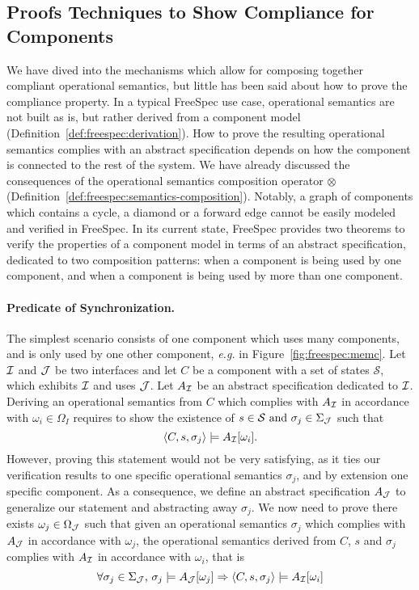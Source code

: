 \subsection{Proofs Techniques to Show Compliance for Components}

We have dived into the mechanisms which allow for composing together compliant
operational semantics, but little has been said about how to prove the
compliance property.
%
In a typical FreeSpec use case, operational semantics are not built as is, but
rather derived from a component model
(Definition~\ref{def:freespec:derivation}).
%
How to prove the resulting operational semantics complies with an abstract
specification depends on how the component is connected to the rest of the
system.
%
We have already discussed the consequences of the operational semantics
composition operator $\otimes$
(Definition~\ref{def:freespec:semantics-composition}).
%
Notably, a graph of components which contains a cycle, a diamond or a forward
edge cannot be easily modeled and verified in FreeSpec.
%
In its current state, FreeSpec provides two theorems to verify the properties
of a component model in terms of an abstract specification, dedicated to two
composition patterns: when a component is being used by one component, and
when a component is being used by more than one component.

\paragraph{Predicate of Synchronization.}
%
The simplest scenario consists of one component which uses many components, and
is only used by one other component, \emph{e.g.} in
Figure~\ref{fig:freespec:memc}.
%
Let $\mathcal{I}$ and $\mathcal{J}$ be two interfaces and let $C$ be a component with a set of
states $\mathcal{S}$, which exhibits $\mathcal{I}$ and uses $\mathcal{J}$.
%
Let $A_{\mathcal{I}}$ be an abstract specification dedicated to $\mathcal{I}$.
%
Deriving an operational semantics from $C$ which complies with $A_{\mathcal{I}}$ in
accordance with $\omega_i \in \Omega_I$ requires to show the existence of
$s \in \mathcal{S} \text{ and }\sigma_j \in \Sigma_{\mathcal{J}}$ such that
\[ \langle C, s, \sigma_j \rangle \models A_{\mathcal{I}}[\omega_i]. \]
%
However, proving this statement would not be very satisfying, as it ties our
verification results to one specific operational semantics $\sigma_j$, and by
extension one specific component.
%
As a consequence, we define an abstract specification $A_{\mathcal{J}}$ to generalize our
statement and abstracting away $\sigma_j$.
%
We now need to prove there exists $\omega_j \in \Omega_{\mathcal{J}}$ such that given an
operational semantics $\sigma_j$ which complies with $A_{\mathcal{J}}$ in accordance with
$\omega_j$, the operational semantics derived from $C$, $s$ and $\sigma_j$
complies with $A_{\mathcal{I}}$ in accordance with $\omega_i$, that is
\[ \forall \sigma_j \in \Sigma_{\mathcal{J}}\text{, }\sigma_j \models A_{\mathcal{J}}[\omega_j]
  \Rightarrow \langle C, s, \sigma_j \rangle \models A_{\mathcal{I}}[\omega_i]
\]

